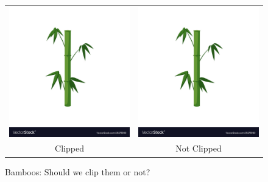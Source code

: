 \documentclass[11pt]{article}
\theoremstyle{definition}
\theoremstyle{plain}
\begin{document}
\begin{figure}[H]
		\centering
		\begin{tabular}{cc}
		\includegraphics[clip, trim=0 3cm 0 0, scale=.15]{./figs/bamboo}	& \includegraphics[scale=.15]{./figs/bamboo} \\
		Clipped & Not Clipped
			\end{tabular}
		\vspace{.5cm}
		\caption{Bamboos: Should we clip them or not?}
		\label{fig:bamboo} %
	\end{figure}
\end{document}
